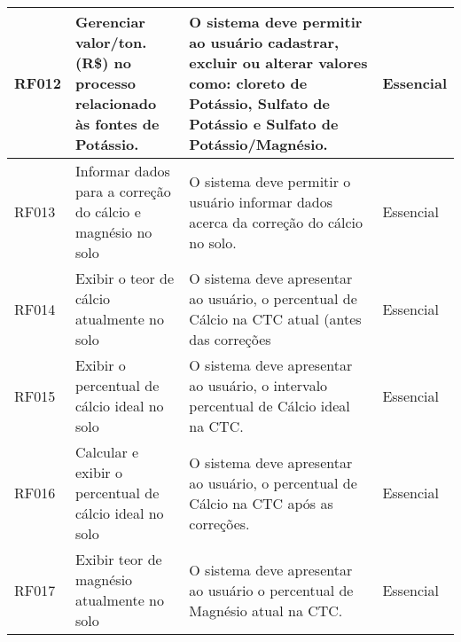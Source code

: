 \begin{table}[!htb]
\begin{tabular}{|m{1cm}|m{4cm}|m{6cm}|m{3cm}|}
        RF012 & Gerenciar valor/ton. (R\$) no processo relacionado às fontes de Potássio.        & O sistema deve permitir ao usuário cadastrar, excluir ou alterar valores como: cloreto de Potássio, Sulfato de Potássio e Sulfato de Potássio/Magnésio.                                                                                                                                        & Essencial  \\\hline
        RF013 & Informar dados para a correção do cálcio e magnésio no solo                      & O sistema deve permitir o usuário informar dados acerca da correção do cálcio no solo.                                                                                                                                                                                                         & Essencial  \\\hline
        RF014 & Exibir o teor de cálcio atualmente no solo                                       & O sistema deve apresentar ao usuário, o percentual de Cálcio na CTC atual (antes das correções                                                                                                                                                                                                 & Essencial  \\\hline
        RF015 & Exibir o percentual de cálcio ideal no solo                                      & O sistema deve apresentar ao usuário, o intervalo percentual de Cálcio ideal na CTC.                                                                                                                                                                                                           & Essencial  \\\hline
        RF016 & Calcular e exibir o percentual de cálcio ideal no solo                           & O sistema deve apresentar ao usuário, o percentual de Cálcio na CTC após as correções.                                                                                                                                                                                                         & Essencial  \\\hline
        RF017 & Exibir teor de magnésio atualmente no solo                                       & O sistema deve apresentar ao usuário o percentual de Magnésio atual na CTC.                                                                                                                                                                                                                    & Essencial  \\\hline

\end{tabular}
\end{table}
